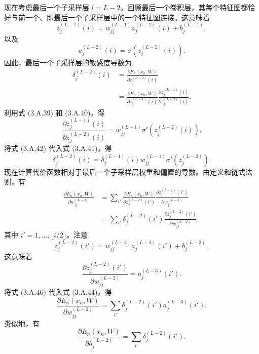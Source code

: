
现在考虑最后一个子采样层 $l=L-2$。回顾最后一个卷积层，其每个特征图都恰好与前一个、即最后一个子采样层中的一个特征图连接。这意味着
\begin{equation}
z_j^{(L-1)}(i)=w_{jj}^{(L-1)}a_j^{(L-2)}(i)+b_j^{(L-1)},
\tag{3.A.39}
\end{equation}
以及
\begin{equation}
a_j^{(L-2)}(i)=\sigma(z_j^{(L-2)}(i)).
\tag{3.A.40}
\end{equation}
因此，最后一个子采样层的敏感度导数为
\begin{equation}
\begin{aligned}
\delta_j^{(L-2)}(i)
&=\frac{\partial E_n(x_n,W)}{\partial z_j^{(L-2)}(i)}\\
&=\frac{\partial E_n(x_n,W)}{\partial z_j^{(L-1)}(i)}
\frac{\partial z_j^{(L-1)}(i)}{\partial z_j^{(L-2)}(i)}.
\end{aligned}
\tag{3.A.41}
\end{equation}
利用式 (3.A.39) 和 (3.A.40)，得
\begin{equation}
\frac{\partial z_j^{(L-1)}(i)}{\partial z_j^{(L-2)}(i)}
=w_{jj}^{(L-1)}\sigma'(z_j^{(L-2)}(i)).
\tag{3.A.42}
\end{equation}
将式 (3.A.42) 代入式 (3.A.41)，得
\begin{equation}
\delta_j^{(L-2)}(i)=\delta_j^{(L-1)}(i)w_{jj}^{(L-1)}\sigma'(z_j^{(L-2)}).
\tag{3.A.43}
\end{equation}
现在计算代价函数相对于最后一个子采样层权重和偏置的导数。由定义和链式法则，有
\begin{equation}
\begin{aligned}
\frac{\partial E_n(x_n,W)}{\partial w_{jj}^{(L-2)}}
&=\sum_{i'}\frac{\partial E_n(x_n,W)}{\partial z_j^{(L-2)}(i')}
\frac{\partial z_j^{(L-2)}(i')}{\partial w_{jj}^{(L-2)}}\\
&=\sum_{i'}\delta_j^{(L-2)}(i')
\frac{\partial z_j^{(L-2)}(i')}{\partial w_{jj}^{(L-2)}},
\end{aligned}
\tag{3.A.44}
\end{equation}
其中 $i'=1,\ldots,\lfloor i/2\rfloor$。注意
\begin{equation}
z_j^{(L-2)}(i')=w_{jj}^{(L-2)}a_j^{(L-3)}(i')+b_j^{(L-2)},
\tag{3.A.45}
\end{equation}
这意味着
\begin{equation}
\frac{\partial z_j^{(L-2)}(i')}{\partial w_{jj}^{(L-2)}}=a_j^{(L-3)}(i').
\tag{3.A.46}
\end{equation}
将式 (3.A.46) 代入式 (3.A.44)，得
\begin{equation}
\frac{\partial E_n(x_n,W)}{\partial w_{jj}^{(L-2)}}
=\sum_{i'}\delta_j^{(L-2)}(i')a_j^{(L-3)}(i').
\tag{3.A.47}
\end{equation}
类似地，有
\begin{equation}
\frac{\partial E_n(x_n,W)}{\partial b_j^{(L-2)}}
=\sum_{i'}\delta_j^{(L-2)}(i').
\tag{3.A.48}
\end{equation}


